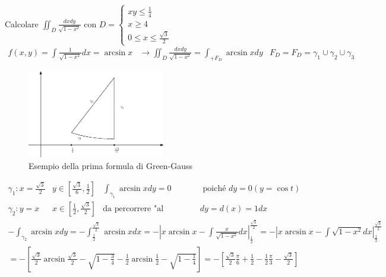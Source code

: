 \begin{esempio}
	Calcolare $\iint_D\frac{dxdy}{\sqrt{1-x^2}}$ con $D=\begin{cases}
		xy\leq \frac{1}{4}\\
		x\geq 4\\
		0\leq x\leq \frac{\sqrt{3}}{2}
	\end{cases}$
	\begin{equation*}
		\begin{matrix}
			f(x,y)=\int\frac{1}{\sqrt{1-x^2}}dx=\arcsin x & \to \iint_D
			\frac{dxdy}{\sqrt{1-x^2}}=\int_{+F_D}\arcsin x dy & F_D=
			F_D=\gamma_1\cup \gamma_2 \cup \gamma_3
		\end{matrix}
	\end{equation*}
	\begin{figure}[ht]
		\centering
		\includegraphics[width=6cm]{img/finiti/greenes.eps}
		\caption{Esempio della prima formula di Green-Gauss}
	\end{figure}
	\begin{equation*}
		\begin{matrix}
			\gamma_1: x=\frac{\sqrt{3}}{2} &
			y\in\left[\frac{\sqrt{3}}{6},\frac{1}{2}\right] & \int_{\gamma_1}\arcsin x dy=0
			& \text{ poiché } dy=0 (y=\cos t)\\
			\gamma_2: y=x & x\in \left[\frac{1}{2}, \frac{\sqrt{3}}{2}\right] &
			\text{da percorrere "al contrario"} & dy=d(x)=1dx
		\end{matrix}
	\end{equation*}
\begin{equation*}
	\begin{matrix}
		-\int_{\gamma_2} \arcsin x dy=-\int_{\frac{1}{2}}^{\frac{\sqrt{3}}{2}}
		\arcsin x dx = -\left| x\arcsin x - \int
		\frac{x}{\sqrt{1-x^2}}dx\right|_{\frac{1}{2}}^{\frac{\sqrt{3}}{2}}= 
		-\left| x\arcsin x - \int
		\sqrt{1-x^2}dx\right|_{\frac{1}{2}}^{\frac{\sqrt{3}}{2}}\\
		= -
		\left[\frac{\sqrt{3}}{2}\arcsin\frac{\sqrt{3}}{2}-\sqrt{1-\frac{3}{4}}
		- \frac{1}{2}\arcsin \frac{1}{2}-\sqrt{1-\frac{1}{4}} \right] =
		-\left[\frac{\sqrt{3}}{2}\frac{\pi}{6}+\frac{1}{2}-\frac{1}{2}
		\frac{\pi}{3} - \frac{\sqrt{3}}{2}\right]\\

\end{matrix}
\end{equation*}
\end{esempio}
